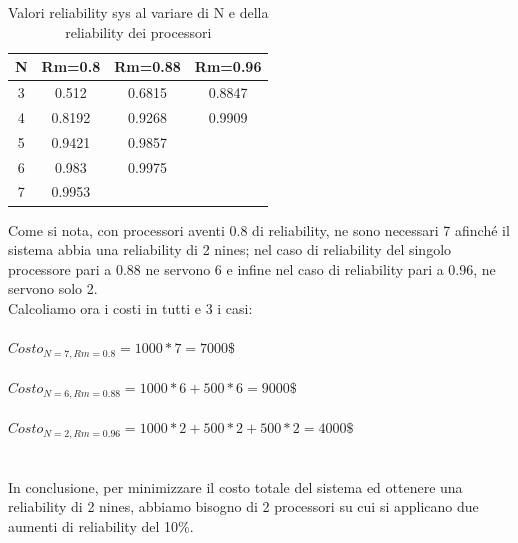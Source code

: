 	\begin{table}[H]
		\footnotesize
		\caption{Valori reliability sys al variare di N e della reliability dei processori}
		\label{tab:rel_tab_es4}
		\centering
		\begin{tabular}{cccc}
			\toprule
			\textbf{N} & \textbf{Rm=0.8} & \textbf{Rm=0.88} & \textbf{Rm=0.96}\\
			\midrule
			3 & 0.512 & 0.6815 & 0.8847\\
			\midrule
			4 & 0.8192 & 0.9268 & 0.9909\\
			\midrule
			5 & 0.9421 & 0.9857 & \\
			\midrule
			6 & 0.983 & 0.9975 & \\
			\midrule
			7 & 0.9953 &  & \\
			\bottomrule
			
		\end{tabular}
		
	\end{table}
	Come si nota, con processori aventi 0.8 di reliability, ne sono necessari 7 afinché il sistema abbia una reliability di 2 nines; nel caso di reliability del singolo processore pari a 0.88 ne servono 6 e infine nel caso di reliability pari a 0.96, ne servono solo 2.\\
	Calcoliamo ora i costi in tutti e 3 i casi:\\\\
	$ Costo_{N=7,Rm=0.8}=1000*7=7000\$ $\\\\
	$ Costo_{N=6,Rm=0.88}=1000*6+500*6=9000\$ $\\\\
	$ Costo_{N=2,Rm=0.96}=1000*2+500*2+500*2=4000\$ $\\\\\\
	In conclusione, per minimizzare il costo totale del sistema ed ottenere una reliability di 2 nines, abbiamo bisogno di 2 processori su cui si applicano due aumenti di reliability del 10\%.\\\\\\\\\\
	
